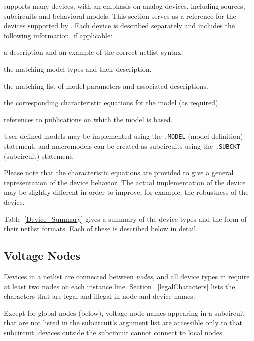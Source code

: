 \Xyce{} supports many devices, with an emphasis on analog devices, including
sources, subcircuits and behavioral models.  This section serves as a reference
for the devices supported by \Xyce{}.  Each device is described separately and
includes the following information, if applicable:
\begin{XyceItemize}
\item a description and an example of the correct netlist syntax.
\item the matching model types and their description.
\item the matching list of model parameters and associated descriptions.
\item the corresponding
 characteristic equations for the model (as required).
\item references to publications on which the model is based.
\end{XyceItemize}
User-defined models may be implemented using the  \texttt{.MODEL} (model definition)
statement, and macromodels can be created as subcircuits using the
 \texttt{.SUBCKT}
(subcircuit) statement.

Please note that the characteristic equations are
provided to give a general representation of the device behavior.  The actual
\Xyce{} implementation of the device may be slightly different in order to
improve, for example, the robustness of the device.

Table~\ref{Device_Summary} gives a summary of the device types and the form of
their netlist formats.  Each of these is described below in detail.





\clearpage
\subsection{Voltage Nodes}
\label{Voltage_Nodes}
  

Devices in a netlist are connected between {\em nodes}, and all device
types in \Xyce{} require at least two nodes on each instance line. Section
~\ref{legalCharacters} lists the characters that are legal and illegal in
\Xyce{} node and device names.

Except for global nodes (below), voltage node names appearing in a
subcircuit that are not listed in the subcircuit's argument list are
accessible only to that subcircuit; devices outside the subcircuit
cannot connect to local nodes.

